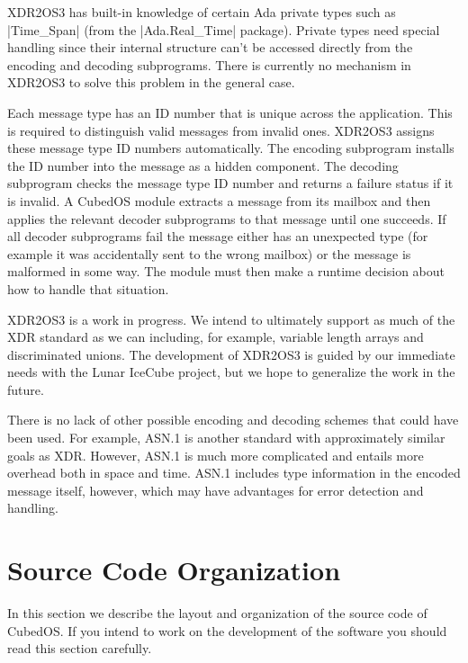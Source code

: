 XDR2OS3 has built-in knowledge of certain Ada private types such as |Time_Span| (from the
|Ada.Real_Time| package). Private types need special handling since their internal structure
can't be accessed directly from the encoding and decoding subprograms. There is currently no
mechanism in XDR2OS3 to solve this problem in the general case.

Each message type has an ID number that is unique across the application. This is required to
distinguish valid messages from invalid ones. XDR2OS3 assigns these message type ID numbers
automatically. The encoding subprogram installs the ID number into the message as a hidden
component. The decoding subprogram checks the message type ID number and returns a failure
status if it is invalid. A CubedOS module extracts a message from its mailbox and then applies
the relevant decoder subprograms to that message until one succeeds. If all decoder subprograms
fail the message either has an unexpected type (for example it was accidentally sent to the
wrong mailbox) or the message is malformed in some way. The module must then make a runtime
decision about how to handle that situation.

XDR2OS3 is a work in progress. We intend to ultimately support as much of the XDR standard as we
can including, for example, variable length arrays and discriminated unions. The development of
XDR2OS3 is guided by our immediate needs with the Lunar IceCube project, but we hope to
generalize the work in the future.

There is no lack of other possible encoding and decoding schemes that could have been used. For
example, ASN.1 \cite{asn.1} is another standard with approximately similar goals as XDR.
However, ASN.1 is much more complicated and entails more overhead both in space and time. ASN.1
includes type information in the encoded message itself, however, which may have advantages for
error detection and handling.

\section{Source Code Organization}
\label{sec:code-organization}

In this section we describe the layout and organization of the source code of CubedOS. If you
intend to work on the development of the software you should read this section carefully.

